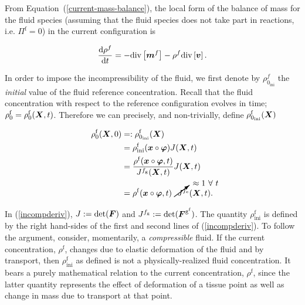 From \mbox{Equation (\ref{current-mass-balance})}, the local form of
the balance of mass for the fluid species (assuming that the fluid
species does not take part in reactions, i.e. $\Pi^\mathrm{f}=0$) in
the current configuration is

\begin{equation}
\frac{\mathrm{d}\rho^f}{\mathrm{d}t} = - \mathrm{div}\left[\mbox{\boldmath$ m$}^f\right]
- \rho^f \mathrm{div}\left[\mbox{\boldmath$ v$}\right].
\label{fluidtransporteqn}
\end{equation}

\noindent In order to impose the incompressibility of the fluid, we
first denote by $\rho_{0_{\mathrm{ini}}}^{f}$ the {\sl initial} value
of the fluid reference concentration. Recall that the fluid
concentration with respect to the reference configuration evolves in
time; $\rho^\mathrm{f}_0 = \rho^\mathrm{f}_0(\mbox{\boldmath$ X$},t)$. Therefore we can
precisely, and non-trivially, define
$\rho_{0_{\mathrm{ini}}}^{\mathrm{f}}(\mbox{\boldmath$ X$})$   

\begin{equation}
\begin{split}
\rho_{0}^{\mathrm{f}}(\bX,0)
                   &=:\rho_{0_{\mathrm{ini}}}^{\mathrm{f}}(\bX)\\ 
                   &=\rho_{\mathrm{ini}}^{\mathrm{f}}(\bx\circ\Bvarphi)
                   J(\bX, t)\\ &=\frac{\rho^{\mathrm{f}}
                   (\bx\circ\Bvarphi,t)} {J^{f_\mathrm{g}}(\bX,t)}
                   J(\bX,t)\\ &=\rho^{\mathrm{f}} (\bx\circ\Bvarphi,t)
                   \cancelto{\approx 1\ \forall\ t}
                   {J^{f_\mathrm{e}}}(\bX,t).\\
\label{incompderiv}
\end{split}
\end{equation}

In (\ref{incompderiv}), $J := \mathrm{det}(\mbox{\boldmath$ F$})$ and $J^{f_\mathrm{g}} :=
\mathrm{det}(\mbox{\boldmath$ F$}^{\mathrm{g}^{\mathrm{f}}})$. The quantity
$\rho_{\mathrm{ini}}^{\mathrm{f}}$ is defined by the right hand-sides
of the first and second lines of (\ref{incompderiv}). To follow the
argument, consider, momentarily, a \emph{compressible} fluid. If the
current concentration, $\rho^\mathrm{f}$, changes due to elastic
deformation of the fluid and by transport, then
$\rho_{\mathrm{ini}}^{\mathrm{f}}$ as defined is not a
physically-realized fluid concentration. It bears a purely
mathematical relation to the current concentration, $\rho^\mathrm{f}$,
since the latter quantity represents the effect of deformation of a
tissue point as well as change in mass due to transport at that
point.

